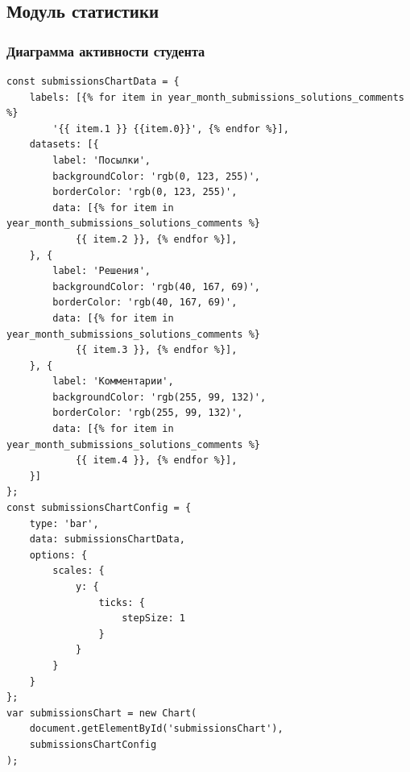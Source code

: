 \documentclass[12pt, a4paper, oneside]{article}
\begin{document}
\subsection{Модуль статистики}
\subsubsection{Диаграмма активности студента}
\begin{verbatim}
const submissionsChartData = {
    labels: [{% for item in year_month_submissions_solutions_comments %}
        '{{ item.1 }} {{item.0}}', {% endfor %}],
    datasets: [{
        label: 'Посылки',
        backgroundColor: 'rgb(0, 123, 255)',
        borderColor: 'rgb(0, 123, 255)',
        data: [{% for item in year_month_submissions_solutions_comments %}
            {{ item.2 }}, {% endfor %}],
    }, {
        label: 'Решения',
        backgroundColor: 'rgb(40, 167, 69)',
        borderColor: 'rgb(40, 167, 69)',
        data: [{% for item in year_month_submissions_solutions_comments %}
            {{ item.3 }}, {% endfor %}],
    }, {
        label: 'Комментарии',
        backgroundColor: 'rgb(255, 99, 132)',
        borderColor: 'rgb(255, 99, 132)',
        data: [{% for item in year_month_submissions_solutions_comments %}
            {{ item.4 }}, {% endfor %}],
    }]
};
const submissionsChartConfig = {
    type: 'bar',
    data: submissionsChartData,
    options: {
        scales: {
            y: {
                ticks: {
                    stepSize: 1
                }
            }
        }
    }
};
var submissionsChart = new Chart(
    document.getElementById('submissionsChart'),
    submissionsChartConfig
);
\end{verbatim}
\end{document}
